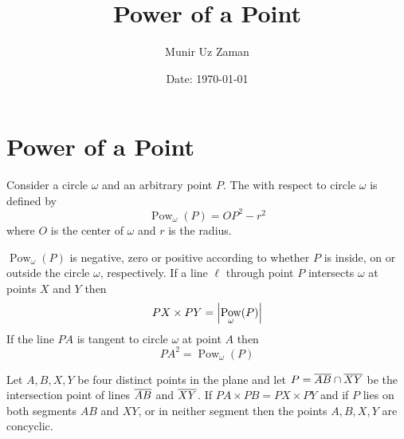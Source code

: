 \documentclass[11pt,numbers=noenddot,svgnames,dvipsnames]{scrartcl}
\title{Power of a Point}
\author{Munir Uz Zaman}
\date{Date: \today}
\DeclareMathOperator{\pow}{Pow}
\begin{document}
\maketitle

\section{Power of a Point}

\begin{theorem}
    Consider a circle $\omega$ and an arbitrary point $P$. 
    The  with respect to circle $\omega$ 
    is defined by 
    \[
        \pow_{\omega}(P) = OP^{2} - r^{2}
    \]
    where $O$ is the center of $\omega$ and $r$ is the radius.
    \begin{itemize}
        \ii $\pow_{\omega}(P)$ is negative, zero or positive according to whether 
        $P$ is inside, on or outside the circle $\omega$, respectively. 
        \ii If a line $\ell$ through point $P$ intersects $\omega$ at points $X$ 
        and $Y$ then 
        \[
            PX \times PY = \abs{\pow_{\omega}(P)}
        \]
        \ii If the line $PA$ is tangent to circle $\omega$ at point $A$ then 
        \[
            PA^{2} = \pow_{\omega}(P)
        \]
    \end{itemize}
\end{theorem}

\begin{theorem}
    Let $A, B, X, Y$ be four distinct points in the plane and let 
    $P = \overline{AB} \cap \overline{XY}$ be the intersection point of lines 
    $\overline{AB}$ and $\overline{XY}$. If $PA \times PB = PX \times PY$ and 
    if $P$ lies on both segments $AB$ and $XY$, or in neither segment 
    then the points $A, B, X, Y$ are concyclic.
\end{theorem}
\end{document}
